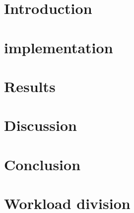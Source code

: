 \documentclass[twoside]{article}
\begin{document}
\begin{multicols}{2} %
\section{Introduction}

\section{implementation}

\section{Results}

\section{Discussion}

\section{Conclusion}

\section{Workload division}







\end{multicols}
\end{document}
